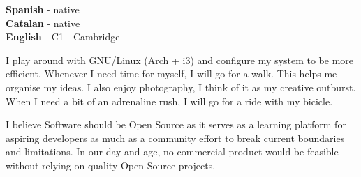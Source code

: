 \documentclass[9pt]{developercv} %
\begin{document}
\begin{minipage}[t]{0.3\textwidth}
	\vspace{-\baselineskip} %

	
	\textbf{Spanish} - native\\
	\textbf{Catalan} - native\\
	\textbf{English} - C1 - Cambridge
\end{minipage}
\hfill
\begin{minipage}[t]{0.3\textwidth}
	\vspace{-\baselineskip} %
	
	
	
	I play around with GNU/Linux (Arch + i3) and configure my system to be more efficient.
	Whenever I need time for myself, I will go for a walk. This helps me organise my ideas.
	I also enjoy photography, I think of it as my creative outburst.
	When I need a bit of an adrenaline rush, I will go for a ride with my bicicle.
\end{minipage}
\hfill
\begin{minipage}[t]{0.3\textwidth}
	\vspace{-\baselineskip} %
	
	
	I believe Software should be Open Source as it serves as a learning platform for aspiring developers as much as a community effort to break current boundaries and limitations. In our day and age, no commercial product would be feasible without relying on quality Open Source projects.
\end{minipage}

\end{document}
